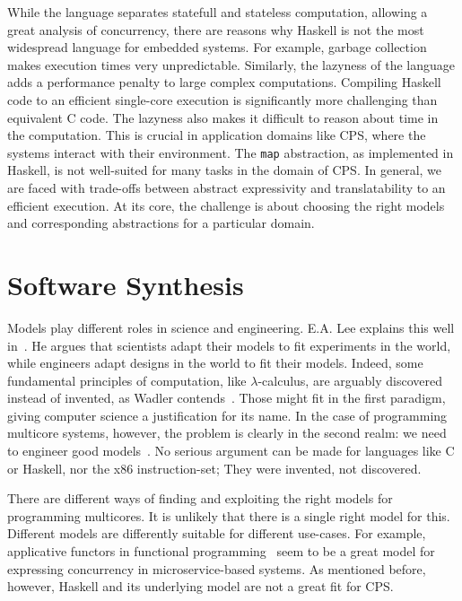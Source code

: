 While the language separates statefull and stateless computation, allowing a great analysis of concurrency, there are reasons why Haskell is not the most widespread language for embedded systems.
For example, garbage collection makes execution times very unpredictable.
Similarly, the lazyness of the language adds a performance penalty to large complex computations.
Compiling Haskell code to an efficient single-core execution is significantly more challenging than equivalent C code.
The lazyness also makes it difficult to reason about time in the computation.
This is crucial in application domains like \ac{CPS}, where the systems interact with their environment.
The \texttt{map} abstraction, as implemented in Haskell, is not well-suited for many tasks in the domain of \ac{CPS}.
In general, we are faced with trade-offs between abstract expressivity and translatability to an efficient execution.
At its core, the challenge is about choosing the right models and corresponding abstractions for a particular domain.

\section{Software Synthesis}

Models play different roles in science and engineering.
E.A. Lee explains this well in~\cite{lee2017plato}.
He argues that scientists adapt their models to fit experiments in the world, while engineers adapt designs in the world to fit their models.
Indeed, some fundamental principles of computation, like $\lambda$-calculus, are arguably discovered instead of invented, as Wadler contends~\cite{wadler2015propositions}.
Those might fit in the first paradigm, giving computer science a justification for its name.
In the case of programming multicore systems, however, the problem is clearly in the second realm: we need to engineer good models~\cite{lee2006problem}.
No serious argument can be made for languages like C or Haskell, nor the x86 instruction-set; They were invented, not discovered.

There are different ways of finding and exploiting the right models for programming multicores.
It is unlikely that there is a single right model for this.
Different models are differently suitable for different use-cases. 
For example, applicative functors in functional programming~\cite{marlow2014haxl} seem to be a great model for expressing  concurrency in microservice-based systems.
As mentioned before, however, Haskell and its underlying model are not a great fit for \ac{CPS}.

